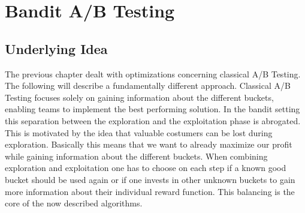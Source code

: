 \documentclass[main.tex]{subfiles}
\begin{document}
\chapter{Bandit A/B Testing}
\section{Underlying Idea}
The previous chapter dealt with optimizations concerning classical A/B Testing. The following will describe a fundamentally different approach. Classical A/B Testing focuses solely on gaining information about the different buckets, enabling teams to implement the best performing solution. In the bandit setting this separation between the exploration and the exploitation phase is abrogated. This is motivated by the idea that valuable costumers can be lost during exploration. Basically this means that we want to already maximize our profit while gaining information about the different buckets. When combining exploration and exploitation one has to choose on each step if a known good bucket should be used again or if one invests in other unknown buckets to gain more information about their individual reward function. This balancing is the core of the now described algorithms.
\end{document}
